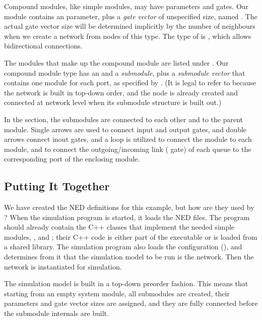 Compound modules, like simple modules, may have parameters and gates.
Our  module contains an  parameter, plus a
\textit{gate vector} of unspecified size, named .
The actual gate vector size will be determined implicitly by the number
of neighbours when we create a network from nodes of this type.
The type of  is , which allows bidirectional
connections.

The modules that make up the compound module are listed under
. Our  compound module type has an  and
a  \textit{submodule}, plus a  \textit{submodule
vector} that contains one  module for each port, as specified by
. (It is legal to refer to  because
the network is built in top-down order, and the node is already created and
connected at network level when its submodule structure is built out.)

In the  section, the submodules are connected to each
other and to the parent module. Single arrows are used to connect input and
output gates, and double arrows connect inout gates, and a  loop
is utilized to connect the  module to each  module, and
to connect the outgoing/incoming link ( gate) of each queue to the
corresponding port of the enclosing module.


\subsection{Putting It Together}

We have created the NED definitions for this example, but how are they used by {\opp}? When
the simulation program is started, it loads the NED files. The program
should already contain the C++ classes that implement the needed simple
modules, ,  and ; their C++ code is either
part of the executable or is loaded from a shared library. The simulation
program also loads the configuration (), and determines
from it that the simulation model to be run is the  network.
Then the network is instantiated for simulation.

The simulation model is built in a top-down preorder fashion. This means
that starting from an empty system module, all submodules are created,
their parameters and gate vector sizes are assigned, and they are fully connected
before the submodule internals are built.

